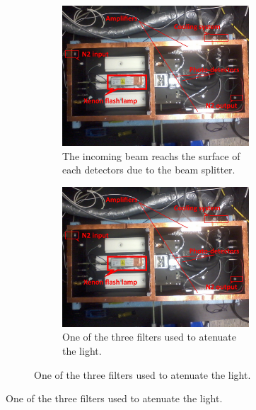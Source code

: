 \documentclass[a4paper, 11pt]{report}%
\begin{document}
\begin{figure}[!hbtp]
  \begin{figure}[!hbtp]
  \centering
  \begin{subfigure}{.5\textwidth}
    \includegraphics[totalheight=.35\textwidth,trim=0cm 7cm 0cm 2.5cm, clip=true,]{../Pictures/blabla/box.jpg}%
    \caption{The incoming beam reachs the surface of each detectors due to the beam splitter.}
    \label{fig:beam_splitter}
  \end{subfigure}%
  \begin{subfigure}{.5\textwidth}
    \includegraphics[totalheight=.35\textwidth,trim=0cm 7cm 0cm 2.5cm, clip=true,]{../Pictures/blabla/box.jpg}
    \caption{One of the three filters used to atenuate the light.}
    \label{fig:filters}
  \end{subfigure}
  \end{figure}
  

\end{figure}
\end{document}
